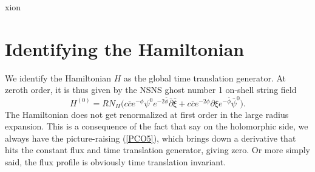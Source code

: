 xion\documentclass[12pt]{article}
\def\be{\begin{equation}}
\def\ee{\end{equation}}
\numberwithin{equation}{section}
\begin{document}
\section{Identifying the Hamiltonian}
We identify the Hamiltonian $H$ as the global time translation generator. At zeroth order, it is thus given by the NSNS ghost number 1 on-shell string field
\be
H^{(0)} = R N_H\big(c\bar{c} e^{-\phi} \psi^0 e^{-2\bar{\phi}} \bar{\partial} \bar{\xi} + c \bar{c} e^{-2\phi}\partial\xi e^{-\bar{\phi}} \bar{\psi}^0\big).
\ee
The Hamiltonian does not get renormalized at first order in the large radius expansion. This is a consequence of the fact that say on the holomorphic side, we always have the picture-raising (\ref{PCO5}), which brings down a derivative that hits the constant flux and time translation generator, giving zero. Or more simply said, the flux profile is obviously time translation invariant.
\end{document}
